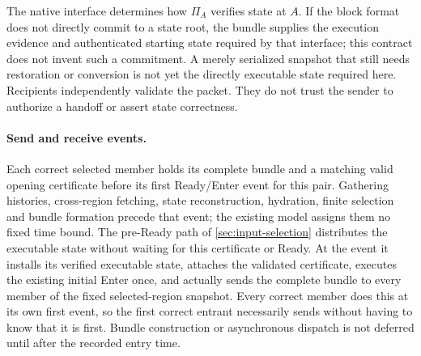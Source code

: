The native interface determines how $\Pi_A$ verifies state at $A$.
If the block format does not directly commit to a state root, the
bundle supplies the execution evidence and authenticated starting state
required by that interface; this contract does not invent such a
commitment. A merely serialized snapshot that still needs restoration
or conversion is not yet the directly executable state required here.
Recipients independently validate the packet. They do not trust the
sender to authorize a handoff or assert state correctness.

\paragraph{Send and receive events.}
Each correct selected member holds its complete bundle and a matching
valid opening certificate before its first Ready/Enter event for this
pair. Gathering histories, cross-region fetching, state reconstruction,
hydration, finite selection and bundle formation precede that event;
the existing model assigns them no fixed time bound. The pre-Ready
 path of \cref{sec:input-selection} distributes
the executable state without waiting for this certificate or Ready.
At the event it
installs its verified executable state, attaches the validated certificate,
executes the existing initial Enter once, and actually sends the complete
bundle to every member of the fixed selected-region snapshot.
Every correct member does this at its own
first event, so the first correct entrant necessarily sends without
having to know that it is first. Bundle construction or asynchronous
dispatch is not deferred until after the recorded entry time.

